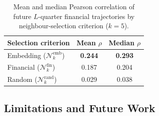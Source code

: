 \documentclass[a4paper,fleqn]{cas-dc}
\newcommand{\nauel}[1]{{\color{orange}{\textbf{Nauel}: #1}}}
\newcommand{\angela}[1]{{\color{magenta}{\textbf{Angela}: #1}}}
\begin{document}
\begin{table}[H]
  \centering
  \caption{Mean and median Pearson correlation of future $L$-quarter financial trajectories by neighbour-selection criterion ($k=5$).}
  \label{tab:neighbor_corr}
  \begin{tabular}{lcc}
    \hline
    \textbf{Selection criterion} & \textbf{Mean} $\rho$ & \textbf{Median} $\rho$ \\
    \hline
    Embedding ($\mathcal{N}_k^{\mathrm{emb}}$) & \textbf{0.244} & \textbf{0.293} \\
    Financial ($\mathcal{N}_k^{\mathrm{fin}}$) & 0.187 & 0.204 \\
    Random    ($\mathcal{N}_k^{\mathrm{rand}}$) & 0.029 & 0.038 \\
    \hline
  \end{tabular}
\end{table}


\subsection{Limitations and Future Work} \label{sec:lim}





\end{document}

